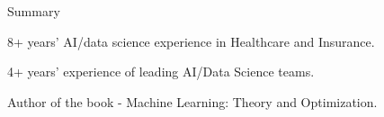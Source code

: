 \documentclass{resume} %
\begin{document}

\begin{rSection}{Summary} 

\begin{rSubsection}{}{}{}{}
\item 8+ years' AI/data science experience in Healthcare and Insurance.
\item 4+ years' experience of leading AI/Data Science teams.
\item Author of the book - Machine Learning: Theory and Optimization.
\end{rSubsection}


\end{rSection}

\end{document}
